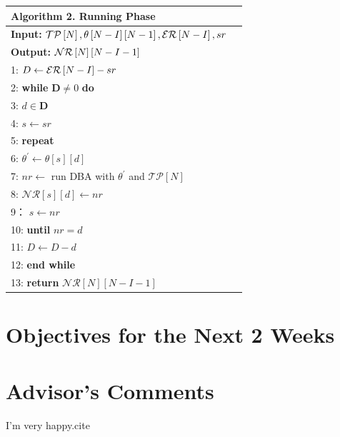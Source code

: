 \documentclass[11pt]{report}
\begin{document}
    \begin{tabular}{ll}
	    \centering
		\toprule
		\textbf{Algorithm 2}. Running Phase\\
		\hline
		\textbf{Input:} $\mathcal{TP}\left[N\right], \theta\left[\mathnormal{N} - \mathnormal{I}\right]\left[\mathnormal{N} - 1\right], \mathcal{ER}\left[\mathnormal{N} - \mathnormal{I}\right], sr$\\
		\textbf{Output:} $\mathcal{NR}\left[\mathnormal{N}\right]\left[\mathnormal{N} - \mathnormal{I} -1\right]$\\
		\hline
		1: $D \gets \mathcal{ER}\left[\mathnormal{N} - \mathnormal{I}\right] - sr$\\
		2: \textbf{while} $\textbf{D} \ne 0$ \textbf{do}\\
		3:  \quad $d \in \textbf{D}$\\
		4:  \quad $s \gets sr$\\
		5:  \quad \textbf{repeat}\\
		6:  \quad\quad $\theta^{'} \gets \theta\left[s\right]\left[d\right]$\\
		7:  \quad\quad $nr \gets$ run DBA with $\theta^{'}$ and $\mathcal{TP}\left[N\right]$\\
		8:  \quad\quad $\mathcal{NR}\left[s\right]\left[d\right] \gets nr$\\
		9：  \quad $s \gets nr$\\
		10: \textbf{until} $nr = d$\\
		11:  $D \gets D - d$\\
		12: \textbf{end while}\\
		13: \textbf{return} $\mathcal{NR}\left[N\right]\left[N - I -1\right]$\\
		\hline
	\end{tabular}
	
	\section{Objectives for the Next 2 Weeks}
	
	
	\section{Advisor's Comments}
	

	I'm very happy.cite \cite{IEEEexample:IEEEwebsite}
	
	
	
	
\end{document}
